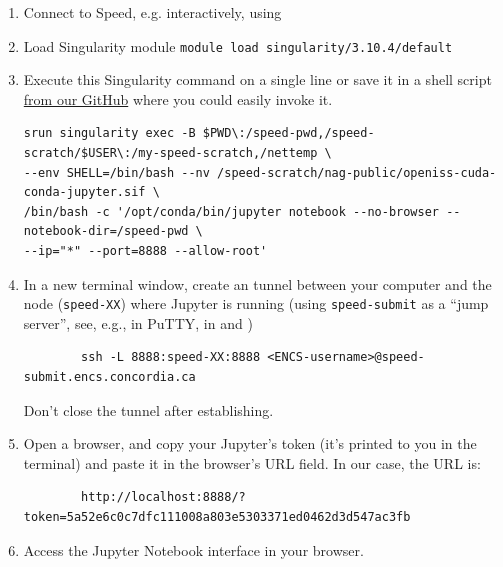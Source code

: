\begin{enumerate}
	\item Connect to Speed, e.g. interactively, using 
	\item Load Singularity module
		\verb+module load singularity/3.10.4/default+

	\item
	Execute this Singularity command on a single line or save it in a shell script
	\href{https://github.com/NAG-DevOps/speed-hpc/blob/master/src/jupyter.sh}{from our GitHub}
	where you could easily invoke it.
	
	\scriptsize
	\begin{verbatim}
srun singularity exec -B $PWD\:/speed-pwd,/speed-scratch/$USER\:/my-speed-scratch,/nettemp \
--env SHELL=/bin/bash --nv /speed-scratch/nag-public/openiss-cuda-conda-jupyter.sif \
/bin/bash -c '/opt/conda/bin/jupyter notebook --no-browser --notebook-dir=/speed-pwd \
--ip="*" --port=8888 --allow-root'
	\end{verbatim}
	\normalsize

	\item
	In a new terminal window, create an  tunnel between your computer and the node (\texttt{speed-XX}) where Jupyter is
	running (using \texttt{speed-submit} as a ``jump server'', see, e.g., in PuTTY, in  and )
	\small
	\begin{verbatim}
		ssh -L 8888:speed-XX:8888 <ENCS-username>@speed-submit.encs.concordia.ca
	\end{verbatim}
	\normalsize
	Don't close the tunnel after establishing.

	\item
	Open a browser, and copy your Jupyter's token (it's printed to you in the terminal)
	and paste it in the browser's URL field.
	In our case, the URL is:
	\small
	\begin{verbatim}
		http://localhost:8888/?token=5a52e6c0c7dfc111008a803e5303371ed0462d3d547ac3fb
	\end{verbatim}
	\normalsize

	\item Access the Jupyter Notebook interface in your browser.
\end{enumerate}

